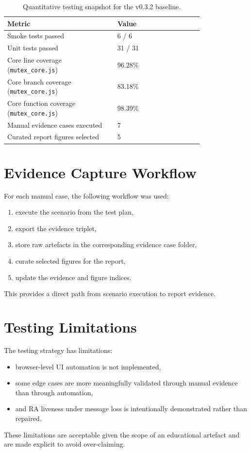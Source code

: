 \begin{table}[htbp]
\centering
\begin{tabular}{p{0.45\linewidth} p{0.35\linewidth}}
\toprule
\textbf{Metric} & \textbf{Value} \\
\midrule
Smoke tests passed & 6 / 6 \\
Unit tests passed & 31 / 31 \\
Core line coverage (\texttt{mutex\_core.js}) & 96.28\% \\
Core branch coverage (\texttt{mutex\_core.js}) & 83.18\% \\
Core function coverage (\texttt{mutex\_core.js}) & 98.39\% \\
Manual evidence cases executed & 7 \\
Curated report figures selected & 5 \\
\bottomrule
\end{tabular}
\caption{Quantitative testing snapshot for the v0.3.2 baseline.}
\label{tab:quant-snapshot}
\end{table}

\section{Evidence Capture Workflow}
For each manual case, the following workflow was used:
\begin{enumerate}
  \item execute the scenario from the test plan,
  \item export the evidence triplet,
  \item store raw artefacts in the corresponding evidence case folder,
  \item curate selected figures for the report,
  \item update the evidence and figure indices.
\end{enumerate}

This provides a direct path from scenario execution to report evidence.

\section{Testing Limitations}
The testing strategy has limitations:
\begin{itemize}
  \item browser-level UI automation is not implemented,
  \item some edge cases are more meaningfully validated through manual evidence than through automation,
  \item and RA liveness under message loss is intentionally demonstrated rather than repaired.
\end{itemize}

These limitations are acceptable given the scope of an educational artefact and are made explicit to avoid over-claiming.